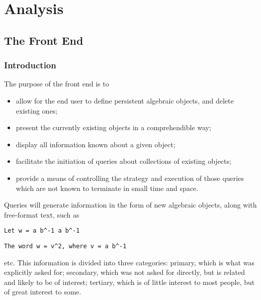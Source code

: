 

\chapter{Analysis}


\section{The Front End}

\subsection{Introduction}

The purpose of the front end is to

\begin{itemize}

\item
allow for the end user to define persistent algebraic objects, and
delete existing ones;

\item
present the currently existing objects in a comprehendible way;

\item
display all information known about a given object;

\item
facilitate the initiation of queries about collections of existing
objects;

\item
provide a means of controlling the strategy and execution of those
queries which are not known to terminate in small time and space.

\end{itemize}


Queries will generate information in the form of new algebraic
objects, along with free-format text, such as
\begin{verbatim}
Let w = a b^-1 a b^-1
\end{verbatim}
\begin{verbatim}
The word w = v^2, where v = a b^-1
\end{verbatim}
etc. This information is divided into three categories: primary, which
is what was explicitly asked for; secondary, which was not asked for
directly, but is related and likely to be of interest; tertiary, which
is of little interest to most people, but of great interest to some.


